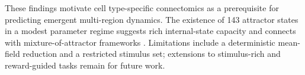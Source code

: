 \documentclass[11pt]{article}
\begin{document}
These findings motivate cell type-specific connectomics \cite{oh2014mesoscale,harris2019hierarchical,kim2017brain} as a prerequisite for predicting emergent multi-region dynamics. The existence of 143 attractor states in a modest parameter regime suggests rich internal-state capacity and connects with mixture-of-attractor frameworks \cite{wang2021synaptic,amit1995model}. Limitations include a deterministic mean-field reduction and a restricted stimulus set; extensions to stimulus-rich and reward-guided tasks remain for future work.



\end{document}
